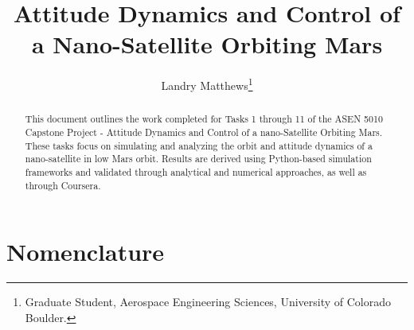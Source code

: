 \documentclass[conf]{new-aiaa}
\title{Attitude Dynamics and Control of a Nano-Satellite Orbiting Mars}
\author{Landry Matthews\footnote{Graduate Student, Aerospace Engineering Sciences, University of Colorado Boulder.}}
\affil{University of Colorado Boulder, Boulder, CO, 80309}
\begin{document}
\maketitle

\begin{abstract}
This document outlines the work completed for Tasks 1 through 11 of the ASEN 5010 Capstone Project - Attitude Dynamics and Control of a nano-Satellite Orbiting Mars. These tasks focus on simulating and analyzing the orbit and attitude dynamics of a nano-satellite in low Mars orbit. Results are derived using Python-based simulation frameworks and validated through analytical and numerical approaches, as well as through Coursera.
\end{abstract}

\section{Nomenclature}
\end{document}
